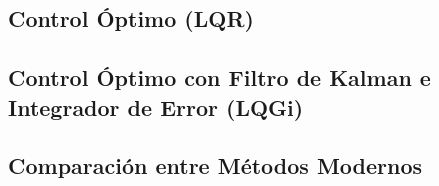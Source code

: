 
\balance
\clearpage
\subsection{Control Óptimo (LQR)}


\balance
\clearpage
\subsection{Control Óptimo con Filtro de Kalman e Integrador de Error (LQGi)}


\balance
\clearpage

\subsection{Comparación entre Métodos Modernos}

